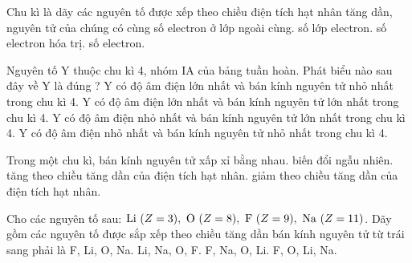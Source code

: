 \documentclass[11pt,a4paper]{article}
\begin{document}
\begin{ex}
Chu kì là dãy các nguyên tố được xếp theo chiều điện tích hạt nhân tăng dần, nguyên tử của chúng có cùng
\choice
{số electron ở lớp ngoài cùng.}
{\True số lớp electron.}
{số electron hóa trị.}
{số electron.}

\end{ex}
\begin{ex}
Nguyên tố Y thuộc chu kì 4, nhóm IA của bảng tuần hoàn. Phát biểu nào sau đây về Y là đúng ?
\choice
{Y có độ âm điện lớn nhất và bán kính nguyên tử nhỏ nhất trong chu kì 4.}
{Y có độ âm điện lớn nhất và bán kính nguyên tử lớn nhất trong chu kì 4.}
{\True Y có độ âm điện nhỏ nhất và bán kính nguyên tử lớn nhất trong chu kì 4.}
{Y có độ âm điện nhỏ nhất và bán kính nguyên tử nhỏ nhất trong chu kì 4.}

\end{ex}
\begin{ex}
Trong một chu kì, bán kính nguyên tử
\choice
{xấp xỉ bằng nhau.}
{biến đổi ngẫu nhiên.}
{tăng theo chiều tăng dần của điện tích hạt nhân.}
{\True giảm theo chiều tăng dần của điện tích hạt nhân.}

\end{ex}
\begin{ex}
Cho các nguyên tố sau: $\ce{Li}\ (Z=3),\ \ce{O}\ (Z=8),\ \ce{F}\ (Z=9),\ \ce{Na}\ (Z=11)$. Dãy gồm các nguyên tố được sắp xếp theo chiều tăng dần bán kính nguyên tử từ trái sang phải là
\choice
{F, Li, O, Na.}
{Li, Na, O, F.}
{F, Na, O, Li.}
{\True F, O, Li, Na.}

\end{ex}
\end{document}
